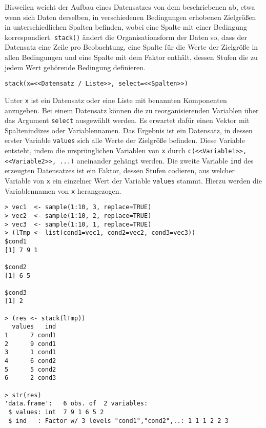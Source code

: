 Bisweilen weicht der Aufbau eines Datensatzes von dem beschriebenen ab, etwa wenn sich Daten derselben, in verschiedenen Bedingungen erhobenen Zielgrößen in unterschiedlichen Spalten befinden, wobei eine Spalte mit einer Bedingung korrespondiert. \lstinline!stack()! ändert die Organisationsform der Daten so, dass der Datensatz eine Zeile pro Beobachtung, eine Spalte für die Werte der Zielgröße in allen Bedingungen und eine Spalte mit dem Faktor enthält, dessen Stufen die zu jedem Wert gehörende Bedingung definieren.
\begin{lstlisting}
stack(x=<<Datensatz / Liste>>, select=<<Spalten>>)
\end{lstlisting}

Unter \lstinline!x! ist ein Datensatz oder eine Liste mit benannten Komponenten anzugeben. Bei einem Datensatz können die zu reorganisierenden Variablen über das Argument \lstinline!select! ausgewählt werden. Es erwartet dafür einen Vektor mit Spaltenindizes oder Variablennamen. Das Ergebnis ist ein Datensatz, in dessen erster Variable \lstinline!values! sich alle Werte der Zielgröße befinden. Diese Variable entsteht, indem die ursprünglichen Variablen von \lstinline!x! durch \lstinline!c(<<Variable1>>, <<Variable2>>, ...)! aneinander gehängt werden. Die zweite Variable \lstinline!ind! des erzeugten Datensatzes ist ein Faktor, dessen Stufen codieren, aus welcher Variable von \lstinline!x! ein einzelner Wert der Variable \lstinline!values! stammt. Hierzu werden die Variablennamen von \lstinline!x! herangezogen.
\begin{lstlisting}
> vec1  <- sample(1:10, 3, replace=TRUE)
> vec2  <- sample(1:10, 2, replace=TRUE)
> vec3  <- sample(1:10, 1, replace=TRUE)
> (lTmp <- list(cond1=vec1, cond2=vec2, cond3=vec3))
$cond1
[1] 7 9 1

$cond2
[1] 6 5

$cond3
[1] 2

> (res <- stack(lTmp))
  values   ind
1      7 cond1
2      9 cond1
3      1 cond1
4      6 cond2
5      5 cond2
6      2 cond3

> str(res)
'data.frame':	6 obs. of  2 variables:
 $ values: int  7 9 1 6 5 2
 $ ind   : Factor w/ 3 levels "cond1","cond2",..: 1 1 1 2 2 3
\end{lstlisting}

